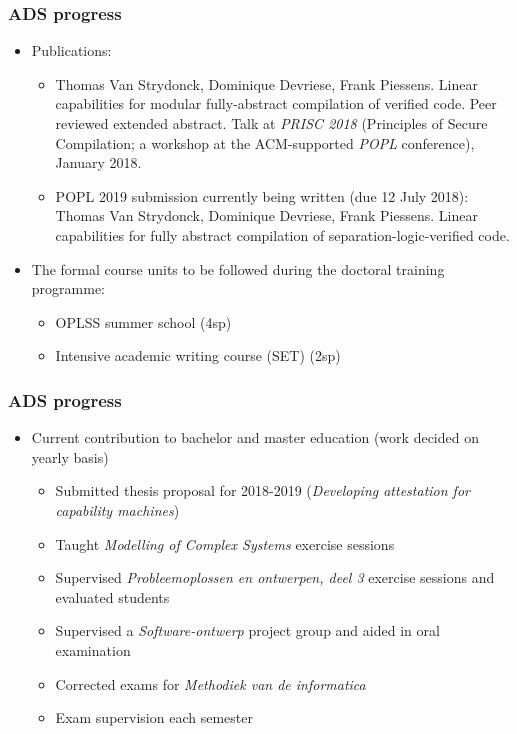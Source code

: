 \documentclass{beamer}
\begin{document}
\begin{frame}
\frametitle{ADS progress}
\begin{itemize}
\item Publications:
	\begin{itemize}
	\item Thomas Van Strydonck, Dominique Devriese, Frank Piessens. Linear capabilities for modular fully-abstract compilation of verified code. Peer reviewed extended abstract. Talk at \emph{PRISC 2018}  (Principles of Secure Compilation; a workshop at the ACM-supported \emph{POPL} conference), January 2018.
	\item POPL 2019 submission currently being written (due 12 July 2018): Thomas Van Strydonck, Dominique Devriese, Frank Piessens. Linear capabilities for fully abstract compilation of separation-logic-verified code.
	\end{itemize}
\item The formal course units to be followed during the doctoral training programme:
	\begin{itemize}
	\item OPLSS summer school (4sp)
	\item Intensive academic writing course (SET) (2sp)	
	\end{itemize}
\end{itemize}
\end{frame}

\begin{frame}
\frametitle{ADS progress}
\begin{itemize}
\item Current contribution to bachelor and master education (work decided on yearly basis)
	\begin{itemize}
	\item Submitted thesis proposal for 2018-2019 (\emph{Developing attestation for capability machines})
	\item Taught \emph{Modelling of Complex Systems}  exercise sessions
	\item Supervised \emph{Probleemoplossen en ontwerpen, deel 3} exercise sessions and evaluated students
	\item Supervised a \emph{Software-ontwerp} project group and aided in oral examination
	\item Corrected exams for \emph{Methodiek van de informatica}
	\item Exam supervision each semester
	\end{itemize}
\end{itemize}
\end{frame}
\end{document}
